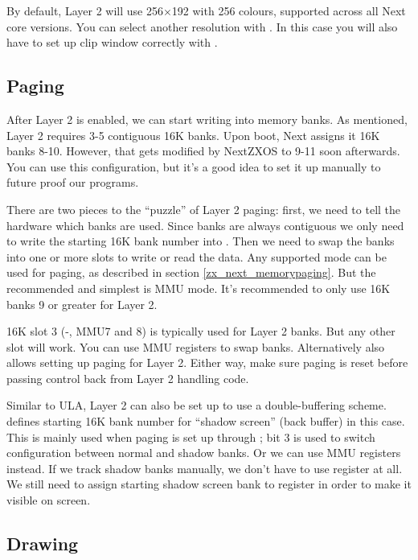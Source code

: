 By default, Layer 2 will use 256$\times$192 with 256 colours, supported across all Next core versions. You can select another resolution with . In this case you will also have to set up clip window correctly with .


\subsection{Paging}

After Layer 2 is enabled, we can start writing into memory banks. As mentioned, Layer 2 requires 3-5 contiguous 16K banks. Upon boot, Next assigns it 16K banks 8-10. However, that gets modified by NextZXOS to 9-11 soon afterwards. You can use this configuration, but it's a good idea to set it up manually to future proof our programs.

There are two pieces to the ``puzzle'' of Layer 2 paging: first, we need to tell the hardware which banks are used. Since banks are always contiguous we only need to write the starting 16K bank number into . Then we need to swap the banks into one or more slots to write or read the data. Any supported mode can be used for paging, as described in section \ref{zx_next_memorypaging}. But the recommended and simplest is MMU mode. It's recommended to only use 16K banks 9 or greater for Layer 2.

16K slot 3 (-, MMU7 and 8) is typically used for Layer 2 banks. But any other slot will work. You can use MMU registers to swap banks. Alternatively  also allows setting up paging for Layer 2. Either way, make sure paging is reset before passing control back from Layer 2 handling code.

Similar to ULA, Layer 2 can also be set up to use a double-buffering scheme.  defines starting 16K bank number for ``shadow screen'' (back buffer) in this case. This is mainly used when paging is set up through ; bit 3 is used to switch configuration between normal and shadow banks. Or we can use MMU registers instead. If we track shadow banks manually, we don't have to use register  at all. We still need to assign starting shadow screen bank to register  in order to make it visible on screen.


\subsection{Drawing}

